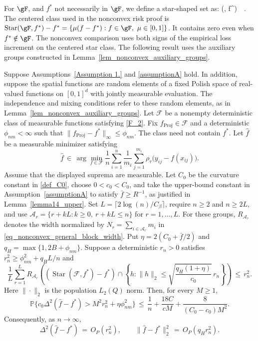 \documentclass[twoside,11pt]{article}
\newcommand{\rev}[1]{{\color{revisionred}#1}}
\newenvironment{revision}{\color{revisionred}}{}
\begin{document}
For $\gF$, and $f^\ast$ not necessarily in $\gF$, we define a star-shaped set as:
\beq 
\label{star_shaped}
(\gF, f^\ast) \,\coloneqq\,  \quad {} \mu \in [0,1].
\beq 
\rev{The centered class used in the nonconvex risk proof is
$\text{Star}(\gF,f^*)-f^*=\{\mu(f-f^*):f\in\gF,\ \mu\in[0,1]\}$.
It contains zero even when $f^*\notin\gF$.}
\begin{revision}
The nonconvex comparison uses both signs of the empirical loss
increment on the centered star class. The following result uses
the auxiliary groups constructed in
Lemma~\ref{lem_nonconvex_auxiliary_groups}.

\begin{theorem}
\label{Theorem_non_convex}
Suppose Assumptions~\ref{Assumption 1.} and \ref{assumptionA} hold.
In addition, suppose the spatial functions are random elements of a
fixed Polish space of real-valued functions on $[0,1]^d$ with
jointly measurable evaluation. The independence and mixing conditions
refer to these random elements, as in
Lemma~\ref{lem_nonconvex_auxiliary_groups}.
Let $\mathcal F$ be a nonempty deterministic class of measurable
functions satisfying \eqref{F_2}. Fix
$f_{\text{Proj}}\in\mathcal F$ and a deterministic $\phi_{nm}<\infty$
such that $\|f_{\text{Proj}}-f^*\|_\infty\leq\phi_{nm}$.
The class need not contain $f^*$.
Let $\hat f$ be a measurable minimizer satisfying
\begin{equation}
\label{main_est_nonconvex}
\hat f\,\in\,\arg\min_{f\in\mathcal F}
\frac1n\sum_{i=1}^n\frac1{m_i}
\sum_{j=1}^{m_i}\rho_\tau\bigl(y_{ij}-f(x_{ij})\bigr).
\end{equation}
Assume that the displayed suprema are measurable.
Let $C_0$ be the curvature constant in \eqref{def_C0},
choose $0<c_0<C_0$, and take the upper-bound constant in
Assumption~\ref{assumptionA} to satisfy $\bar f\geq R^{-1}$,
as justified in Lemma~\ref{lemma14_upper}.
Set $L=\lceil2\log(n)/C_\beta\rceil$, require $n\geq2$ and $n\geq2L$,
and use
$\mathcal A_r=\{r+kL:k\geq0,\ r+kL\leq n\}$ for $r=1,\ldots,L$.
For these groups, $R_{\mathcal A_r}$ denotes the width normalized by
$N_r=\sum_{i\in\mathcal A_r}m_i$ in
\eqref{eq_nonconvex_general_block_width}.
Put $\eta=2(C_0+\bar f/2)$ and $q_H=\max\{1,2B+\phi_{nm}\}$.
Suppose a deterministic $r_n>0$ satisfies
$r_n^2\geq\phi_{nm}^2+q_HL/n$ and
\begin{equation}
\label{eq_nonconvex_main_fixed_point}
\frac1L\sum_{r=1}^L R_{\mathcal A_r}
\left(
(\operatorname{Star}(\mathcal F,f^*)-f^*)\cap
\left\{h:\|h\|_2\leq
\sqrt{\frac{q_H(1+\eta)}{c_0}}\,r_n\right\}
\right)
\,\leq\,r_n^2.
\end{equation}
Here $\|\cdot\|_2$ is the population $L_2(Q)$ norm.
Then, for every $M\geq1$,
\[
\mathbb P\{c_0\Delta^2(\hat f-f^*)>
M^2r_n^2+\eta\phi_{nm}^2\}
\,\leq\,\frac1n+\frac{18C}{cM}
+\frac{8}{(C_0-c_0)M^2}.
\]
Consequently, as $n\to\infty$,
\[
\Delta^2(\hat f-f^*)\,=\,O_P(r_n^2),
\qquad
\|\hat f-f^*\|_2^2\,=\,O_P(q_Hr_n^2).
\]
\end{theorem}


\end{revision}
\end{document}
